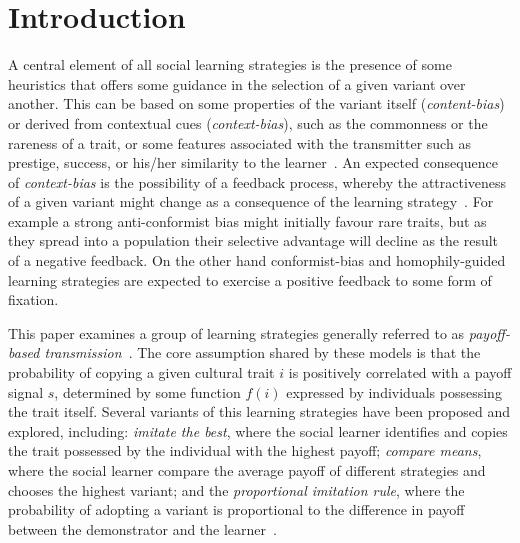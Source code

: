 \documentclass[3p,authoryear,twocolumn]{elsarticle} %
\begin{document}
\section{Introduction}



A central element of all social learning strategies is the presence of some heuristics that offers some guidance in the selection of a given variant over another. This  can be based on some properties of the variant itself (\emph{content-bias}) or derived from contextual cues (\emph{context-bias}), such as the commonness or the rareness of a trait, or some features associated with the transmitter such as prestige, success, or his/her similarity to the learner~\citep{henrich_mcelreath2003}. An expected consequence of \emph{context-bias} is the possibility of a feedback process, whereby the attractiveness of a given variant might change as a consequence of the learning strategy~\citep{kendal_etal_2009}. For example a strong anti-conformist bias might initially favour rare traits, but as they spread into a population their selective advantage will decline as the result of a negative feedback. On the other hand conformist-bias and homophily-guided learning strategies are expected to exercise a positive feedback to some form of fixation. 

This paper examines a group of learning strategies generally referred to as \emph{payoff-based transmission}~\citep{schlag1998,kendal_etal_2009,lake_and_crema_2012,baldini2013,kandler_and_laland_2013,crema_lake_inpress}. The core assumption shared by these models is that the probability of copying a given cultural trait $i$ is positively correlated with a payoff signal $s$, determined by some function $f(i)$ expressed by individuals possessing the trait itself. Several variants of this learning strategies have been proposed and explored, including: \emph{imitate the best}, where the social learner identifies and copies the trait possessed by the individual with the highest payoff; \emph{compare means}, where the social learner compare the average payoff of different strategies and chooses the highest variant; and the \emph{proportional imitation rule}, where the probability of adopting a variant is proportional to the difference in payoff between the demonstrator and the learner~\citep{schlag1998,baldini2013}. 
\end{document}
